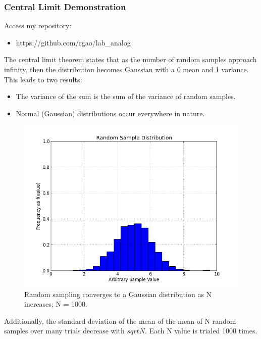 \documentclass[12pt]{article}
\begin{document}
\subsubsection{Central Limit Demonstration}
Access my repository:
\begin{itemize}
\item https://github.com/rgao/lab\_analog\end{itemize}
The central limit theorem states that as the number of random samples
approach infinity, then the distribution becomes Gaussian with a 0
mean and 1 variance. This leads to two results:
\begin{itemize}
\item The variance of the sum is the sum of the variance of random samples.
\item Normal (Gaussian) distributions occur everywhere in nature.\end{itemize}
\begin{figure}[H]
\centering
\includegraphics[width=.9\textwidth]{central_limit_1.png}
\caption{Random sampling converges to a Gaussian distribution as N
  increases; N = 1000.}
\end{figure}
Additionally, the standard deviation of the mean of the mean of N random
samples over many trials decrease with $sqrt{N}$. Each N value is trialed 1000 times.
\end{document}
